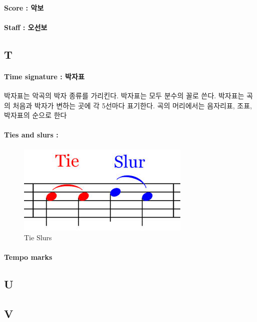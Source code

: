 \documentclass[12pt, a4paper, oneside]{book}
\begin{document}
\paragraph{Score : 악보}

\paragraph{Staff : 오선보}


	\subsection{T}



\paragraph{Time signature : 박자표}

박자표는 악곡의 박자 종류를 가리킨다. 
박자표는 모두 분수의 꼴로 쓴다. 
박자표는 곡의 처음과 박자가 변하는 곳에 각 5선마다 표기한다. 곡의 머리에서는 음자리표, 조표, 박자표의 순으로 한다


\paragraph{Ties and slurs : }


	\begin{figure}[!h]
	\centering
	\includegraphics[width=0.5\columnwidth]{./fig/tieslur.jpg}
	\caption{Tie Slurs }
	\label{fig:figure1}
	\end{figure}


\paragraph{Tempo marks}

	\subsection{U}

	\subsection{V}
\end{document}

